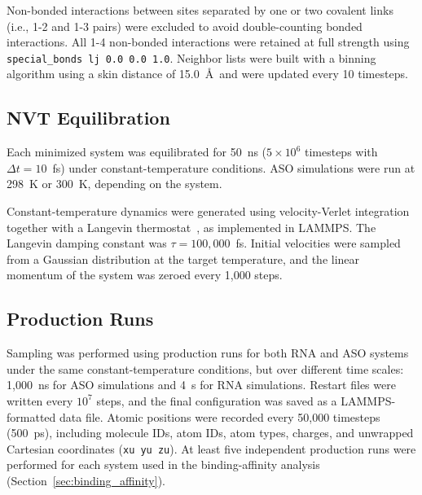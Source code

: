 Non-bonded interactions between sites separated by one or two covalent links
(i.e., 1-2 and 1-3 pairs) were excluded to avoid double-counting bonded
interactions. All 1-4 non-bonded interactions were retained at full strength
using \texttt{special\_bonds lj 0.0 0.0 1.0}. Neighbor lists were built with a
binning algorithm using a skin distance of 15.0~\AA\ and were updated every
10 timesteps.


\subsection{NVT Equilibration}

Each minimized system was equilibrated for 50~ns
($5 \times 10^{6}$ timesteps with $\Delta t = 10$~fs) under constant-temperature
conditions. ASO simulations were run at 298~K or 300~K, depending on the
system.

Constant-temperature dynamics were generated using velocity-Verlet
integration together with a Langevin thermostat~\cite{Schneider1978}, as
implemented in LAMMPS. The Langevin damping constant was
$\tau = 100{,}000$~fs. Initial velocities were sampled from a Gaussian
distribution at the target temperature, and the linear momentum of the system
was zeroed every 1,000 steps.


\subsection{Production Runs}
\label{sec:production}

Sampling was performed using production runs for both RNA and ASO systems
under the same constant-temperature conditions, but over different time
scales: 1,000~ns for ASO simulations and 4~\textmu s for RNA simulations.
Restart files were written every $10^7$ steps, and the final configuration was
saved as a LAMMPS-formatted data file. Atomic positions were recorded every
50,000 timesteps (500~ps), including molecule IDs, atom IDs, atom types,
charges, and unwrapped Cartesian coordinates (\texttt{xu yu zu}). At least
five independent production runs were performed for each system used in the
binding-affinity analysis (Section~\ref{sec:binding_affinity}).

